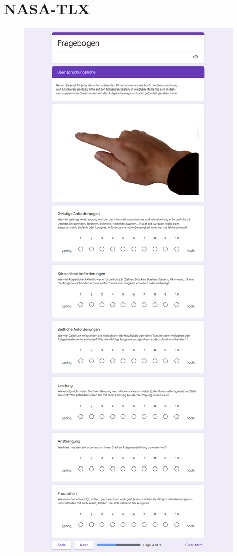 \section{NASA-TLX}
\begin{figure}[hbt!]
\centering
\includegraphics[width=\textwidth]{figures/Appendix/nasa tlx.png}
\end{figure}

